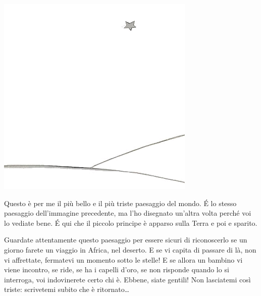 \documentclass[11pt]{scrbook}
\begin{document}
\begin{center}
\includegraphics{img/27a}
\end{center}

Questo è per me il più bello e il più triste paesaggio del mondo. É lo stesso paesaggio dell'immagine precedente, ma l'ho disegnato un'altra volta perché voi lo vediate bene. É qui che il piccolo principe è apparso sulla Terra e poi e sparito.

Guardate attentamente questo paesaggio per essere sicuri di riconoscerlo se un giorno farete un viaggio in Africa, nel deserto. E se vi capita di passare di là, non vi affrettate, fermatevi un momento sotto le stelle! E se allora un bambino vi viene incontro, se ride, se ha i capelli d'oro, se non risponde quando lo si interroga, voi indovinerete certo chi è. Ebbene, siate gentili! Non lasciatemi così triste: scrivetemi subito che è ritornato\ldots{}
\end{document}
